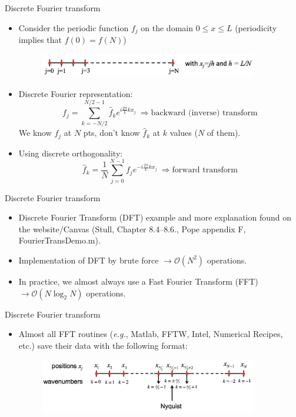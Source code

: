 \begin{frame}{Discrete Fourier transform}

\begin{itemize}
	\item Consider the periodic function $f_j$ on the domain $0\leq x \leq L$ (periodicity implies that $f(0) = f(N)$) \begin{figure}
		\includegraphics[width=0.9\textwidth]{discrete1.png}	
	\end{figure}
	\item Discrete Fourier representation:$$f_j = \sum_{k=-N/2}^{N/2-1} \hat f_k e^{i\frac{2\pi}{L}kx_j}\ \Rightarrow \text{backward (inverse) transform}$$
	We know $f_j$ at $N$ pts, don't know $\hat f_k$ at $k$ values ($N$ of them).
 	\item Using discrete orthogonality:$$\hat f_k = \frac{1}{N} \sum_{j=0}^{N-1} f_j e^{-i\frac{2\pi}{L}kx_j}\ \Rightarrow \text{forward transform}$$
 	
\end{itemize}
\end{frame}

\begin{frame}{Discrete Fourier transform}

\begin{itemize}
	\item Discrete Fourier Transform (DFT) example and more explanation found on the website/Canvas (Stull, Chapter 8.4--8.6., Pope appendix F, FourierTransDemo.m).
	\item Implementation of DFT by brute force $\rightarrow \mathcal{O}(N^2)$ operations.
	\item In practice, we almost always use a Fast Fourier Transform (FFT) $\rightarrow \mathcal{O}(N\log_2 N)$ operations.
\end{itemize}
\end{frame}

\begin{frame}{Discrete Fourier transform}

\begin{itemize}
	\item Almost all FFT routines (\textit{e.g.}, Matlab, FFTW, Intel, Numerical Recipes, etc.) save their data with the following format:
	\begin{figure}
		\includegraphics[width=0.9\textwidth]{discrete2.png}	
	\end{figure}
\end{itemize}
\end{frame}


